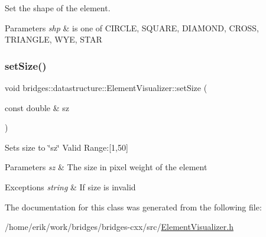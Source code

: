 Set the shape of the element. 


\begin{DoxyParams}{Parameters}
{\em shp} & is one of C\+I\+R\+C\+LE, S\+Q\+U\+A\+RE, D\+I\+A\+M\+O\+ND, C\+R\+O\+SS, T\+R\+I\+A\+N\+G\+LE, W\+YE, S\+T\+AR \\
\hline
\end{DoxyParams}
\mbox{\label{classbridges_1_1datastructure_1_1_element_visualizer_a021333b1c20dd55627ac80ae3a2138e6}} 
\subsubsection{\texorpdfstring{set\+Size()}{setSize()}}
{\footnotesize\ttfamily void bridges\+::datastructure\+::\+Element\+Visualizer\+::set\+Size (\begin{DoxyParamCaption}\item[{const double \&}]{sz }\end{DoxyParamCaption})\hspace{0.3cm}{\ttfamily [inline]}}

Sets size to \char`\"{}sz\char`\"{} Valid Range\+:\mbox{[}1,50\mbox{]}


\begin{DoxyParams}{Parameters}
{\em sz} & The size in pixel weight of the element \\
\hline
\end{DoxyParams}

\begin{DoxyExceptions}{Exceptions}
{\em string} & If size is invalid \\
\hline
\end{DoxyExceptions}


The documentation for this class was generated from the following file\+:\begin{DoxyCompactItemize}
\item 
/home/erik/work/bridges/bridges-\/cxx/src/\hyperlink{_element_visualizer_8h}{Element\+Visualizer.\+h}\end{DoxyCompactItemize}
